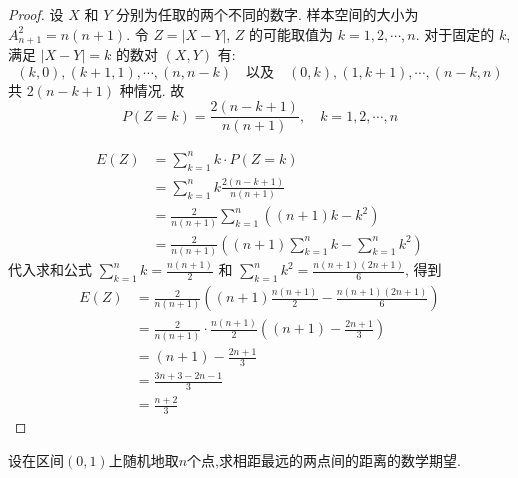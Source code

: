 \documentclass[../main.tex]{subfiles}
\begin{document}
\begin{proof}
设 $X$ 和 $Y$ 分别为任取的两个不同的数字. 样本空间的大小为 $A_{n+1}^{2}= n\left( n+ 1 \right)$.
令 $Z= \left| X-Y \right|$, $Z$ 的可能取值为 $k= 1,2,\cdots,n$.
对于固定的 $k$, 满足 $\left| X-Y \right|= k$ 的数对 $\left( X,Y \right)$ 有:
$$\left( k,0 \right),\left( k+ 1,1 \right),\cdots,\left( n,n-k \right) \quad \text{以及} \quad \left( 0,k \right),\left( 1,k+ 1 \right),\cdots,\left( n-k,n \right)$$
共 $2\left( n-k+ 1 \right)$ 种情况. 故 
$$P\left( Z= k \right)= \frac{2\left( n-k+ 1 \right) }{n\left( n+ 1 \right) },\quad k= 1,2,\cdots,n$$

$$\begin{aligned}
E\left( Z \right) &= \sum _{k= 1}^{n}k \cdot P\left( Z= k \right) \\ 
 &= \sum _{k= 1}^{n}k \frac{2\left( n-k+ 1 \right) }{n\left( n+ 1 \right) } \\ 
 &= \frac{2 }{n\left( n+ 1 \right) }\sum _{k= 1}^{n}\left( \left( n+ 1 \right)k- k^{2} \right) \\ 
 &= \frac{2 }{n\left( n+ 1 \right) }\left( \left( n+ 1 \right)\sum _{k= 1}^{n}k- \sum _{k= 1}^{n}k^{2} \right) 
\end{aligned}$$
代入求和公式 $\sum _{k= 1}^{n}k= \frac{n\left( n+ 1 \right) }{2 }$ 和 $\sum _{k= 1}^{n}k^{2}= \frac{n\left( n+ 1 \right)\left( 2n+ 1 \right) }{6 }$, 得到
$$\begin{aligned}
E\left( Z \right) &= \frac{2 }{n\left( n+ 1 \right) }\left( \left( n+ 1 \right)\frac{n\left( n+ 1 \right) }{2 }-\frac{n\left( n+ 1 \right)\left( 2n+ 1 \right) }{6 } \right) \\ 
 &= \frac{2 }{n\left( n+ 1 \right) } \cdot \frac{n\left( n+ 1 \right) }{2 }\left( \left( n+ 1 \right)-\frac{2n+ 1 }{3 } \right) \\ 
 &= \left( n+ 1 \right)-\frac{2n+ 1 }{3 } \\ 
 &= \frac{3n+ 3- 2n- 1 }{3 } \\ 
 &= \frac{n+ 2 }{3 }
\end{aligned}$$
\end{proof}

\begin{exercise}{}{}
设在区间\((0,1)\)上随机地取\(n\)个点,求相距最远的两点间的距离的数学期望.
\end{exercise}
\end{document}
